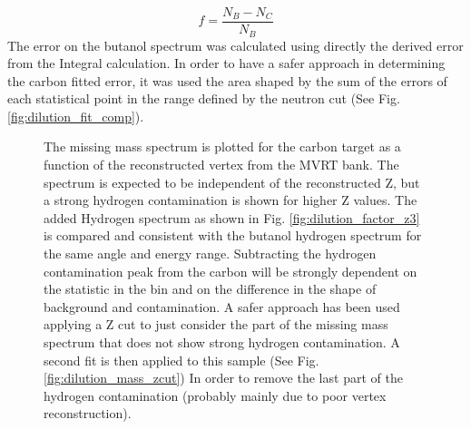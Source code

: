 \begin{equation} \label{eqn:dil_factor}
  f = \frac{N_B - N_C}{N_B}
\end{equation}
The error on the butanol spectrum was calculated using directly the derived error from the Integral calculation. In order to have a safer approach in determining the carbon fitted error, it was used the area shaped by the sum of the errors of each statistical point in the range defined by the neutron cut (See Fig. \ref{fig:dilution_fit_comp}). 
\begin{figure}[htb]
  \begin{center}
    \qquad
    \qquad

    \caption{The missing mass spectrum is plotted for the carbon target as a function of the reconstructed vertex from the MVRT bank. The spectrum is expected to be independent of the reconstructed Z, but a strong hydrogen contamination is shown for higher Z values. The added Hydrogen spectrum as shown in Fig. \ref{fig:dilution_factor_z3} is compared and consistent with the butanol hydrogen spectrum for the same angle and energy range. Subtracting the hydrogen contamination peak from the carbon will be strongly dependent on the statistic in the bin and on the difference in the shape of background and contamination. A safer approach has been used applying a Z cut to just consider the part of the missing mass spectrum that does not show strong hydrogen contamination. A second fit is then applied to this sample (See Fig. \ref{fig:dilution_mass_zcut}) In order to remove the last part of the hydrogen contamination (probably mainly due to poor vertex reconstruction).}
    \label{fig:dilution_factor_z0}
  \end{center}
\end{figure}

